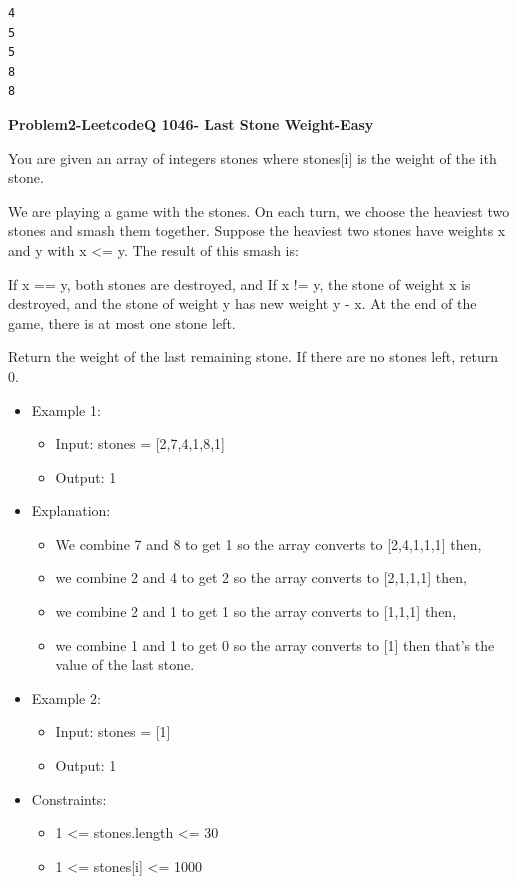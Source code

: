 \documentclass[11pt]{article}
\providecommand{\tightlist}{%
      \setlength{\itemsep}{0pt}\setlength{\parskip}{0pt}}
\begin{document}
    \begin{Verbatim}[commandchars=\\\{\}]
4
5
5
8
8
    \end{Verbatim}

    \textbf{Problem2-LeetcodeQ 1046- Last Stone Weight-Easy}

You are given an array of integers stones where stones{[}i{]} is the
weight of the ith stone.

We are playing a game with the stones. On each turn, we choose the
heaviest two stones and smash them together. Suppose the heaviest two
stones have weights x and y with x \textless= y. The result of this
smash is:

If x == y, both stones are destroyed, and If x != y, the stone of weight
x is destroyed, and the stone of weight y has new weight y - x. At the
end of the game, there is at most one stone left.

Return the weight of the last remaining stone. If there are no stones
left, return 0.

\begin{itemize}
\item
  Example 1:

  \begin{itemize}
  \tightlist
  \item
    Input: stones = {[}2,7,4,1,8,1{]}
  \item
    Output: 1
  \end{itemize}
\item
  Explanation:

  \begin{itemize}
  \tightlist
  \item
    We combine 7 and 8 to get 1 so the array converts to {[}2,4,1,1,1{]}
    then,
  \item
    we combine 2 and 4 to get 2 so the array converts to {[}2,1,1,1{]}
    then,
  \item
    we combine 2 and 1 to get 1 so the array converts to {[}1,1,1{]}
    then,
  \item
    we combine 1 and 1 to get 0 so the array converts to {[}1{]} then
    that's the value of the last stone.
  \end{itemize}
\item
  Example 2:

  \begin{itemize}
  \tightlist
  \item
    Input: stones = {[}1{]}
  \item
    Output: 1
  \end{itemize}
\item
  Constraints:

  \begin{itemize}
  \tightlist
  \item
    1 \textless= stones.length \textless= 30
  \item
    1 \textless= stones{[}i{]} \textless= 1000
  \end{itemize}
\end{itemize}
\end{document}
